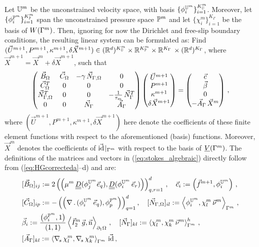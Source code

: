Let $\mathbb{U}^m$ be the unconstrained velocity space, with basis
$\{\phi_i^{\mathbb{U}^m}\}_{i=1}^{K^m_{\mathbb{U}}}$. Moreover, let
$\{\phi_i^{\mathbb{P}^m}\}_{i=1}^{K^m_{\mathbb{P}}}$ span the unconstrained pressure
space $\mathbb{P}^m$ and let $\{\chi_i^m\}_{i=1}^{K_\Gamma}$ be the basis of
$W(\Gamma^m)$. Then, ignoring for now the Dirichlet and free-slip boundary conditions,
the resulting linear system can be formulated as: Find ${(\vec U^{m+1},P^{m+1},
\kappa^{m+1},\delta\vec X^{m+1})\in (\mathbb R^d)^{K^m_{\mathbb{U}}}\times
\mathbb R^{K^m_{\mathbb{P}}} \times \mathbb R^{K_\Gamma}\,\times (\mathbb R^d)^{K_\Gamma}}$, where $\vec
X^{m+1} = \vec X^m+ \delta\vec X^{m+1}$, such that
\begin{equation}
\begin{pmatrix}
\vec B_\Omega & \vec C_\Omega & -\gamma\,\vec{N}_{\Gamma,\Omega} & 0 \\
\vec C^T_\Omega & 0 & 0 & 0 \\
\vec{N}_{\Gamma,\Omega}^T & 0 & 0 & -\frac1{\tau_m}\,\vec N_\Gamma^T \\
0 & 0 & \vec N_\Gamma & \vec A_\Gamma
\end{pmatrix}
\begin{pmatrix}
\vec U^{m+1} \\
P^{m+1} \\
\kappa^{m+1} \\
\delta\vec X^{m+1}
\end{pmatrix}
=
\begin{pmatrix}
\vec c \\
\vec \beta \\
0 \\
-\vec A_\Gamma\,\vec X^m
\end{pmatrix} \,,
\label{eq:stokes_algebraic}
\end{equation}
where $(\vec U^{m+1},P^{m+1},\kappa^{m+1},\delta\vec X^{m+1})$ here denote the
coefficients of these finite element functions with respect to the
aforementioned (basis) functions.
Moreover, $\vec X^m$ denotes the coefficients of
$\vec{\rm id}\!\mid_{\Gamma^m}$ with respect to the basis of $\underline{V}(\Gamma^m)$. The definitions
of the matrices and vectors in (\ref{eq:stokes_algebraic}) directly follow from
(\ref{eq:HGcorrecteda}--d) and are:
\begin{align*}
& [\vec B_\Omega]_{ij} := 2\left(\left(\mu^m\,\mat D(\phi_j^{\uspacesimple^m}
\vec e_q), \mat D( \phi_i^{\uspacesimple^m}\,\vec e_r) \right)
\right)_{q,r=1}^d\,,\quad
\vec c_i := \left( \vec f^{m+1},\phi_i^{\uspacesimple^m}\right)\,,\\
&[\vec C_\Omega]_{ip} := - \left(
\left(\nabla\,.\,(\phi_i^{\uspacesimple^m}\,\vec
e_q), \phi_p^{\pspace^m} \right) \right)_{q=1}^d,\quad
[\Nbulk]_{il} := \left\langle \phi_i^{\uspacesimple^m}, \chi^m_l \,\vec\nu^m
\right\rangle_{\Gamma^m} \,,\\
& \vec \beta_i := \frac{\left(\phi_i^{\pspace^m},1\right)}{\left(1,1\right)}
\left\langle \vec I_2^m\,\vec g,\unitn\right\rangle_{\partial_1\Omega}\,,\quad
[\vec N_\Gamma]_{kl} := \left\langle \chi^m_l, \chi^m_k\,\vec\nu^m
\right\rangle_{\Gamma^m}^h \,,\\
& [\vec A_\Gamma]_{kl} := \left\langle \nabs\,\chi^m_l, \nabs\,\chi^m_k
\right\rangle_{\Gamma^m} \,\vec\id \,,
\end{align*}

